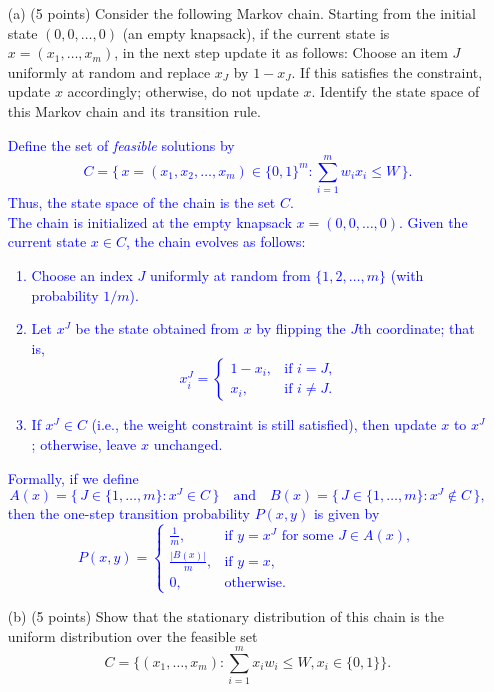 \documentclass{article}
\begin{document}
\begin{itemize}
    \item[(a)] (5 points) Consider the following Markov chain. Starting from the initial state $(0,0, \dots, 0)$ (an empty knapsack), if the current state is $x = (x_1, \dots, x_m)$, in the next step update it as follows: Choose an item $J$ uniformly at random and replace $x_J$ by $1 - x_J$. If this satisfies the constraint, update $x$ accordingly; otherwise, do not update $x$. Identify the state space of this Markov chain and its transition rule.

        \textcolor{blue}{
            Define the set of \emph{feasible} solutions by
\[
C = \{\, x = (x_1, x_2, \dots, x_m) \in \{0,1\}^m : \sum_{i=1}^m w_i x_i \le W \,\}.
\]
Thus, the state space of the chain is the set \( C \). \\ 
The chain is initialized at the empty knapsack \( x = (0,0,\dots,0) \). Given the current state \( x \in C \), the chain evolves as follows:
\begin{enumerate}
    \item Choose an index \( J \) uniformly at random from \( \{1,2,\dots, m\} \) (with probability \(1/m\)).
    \item Let \( x^J \) be the state obtained from \( x \) by flipping the \( J \)th coordinate; that is, 
    \[
    x^J_i = 
    \begin{cases}
    1-x_i, & \text{if } i=J, \\
    x_i, & \text{if } i\neq J.
    \end{cases}
    \]
    \item If \( x^J \in C \) (i.e., the weight constraint is still satisfied), then update \( x \) to \( x^J \); otherwise, leave \( x \) unchanged.
\end{enumerate}
Formally, if we define
\[
A(x) = \{\, J \in \{1,\dots, m\} : x^J \in C \,\} \quad \text{and} \quad B(x) = \{\, J \in \{1,\dots, m\} : x^J \notin C \,\},
\]
then the one-step transition probability \( P(x,y) \) is given by
\[
P(x,y) =
\begin{cases}
\displaystyle \frac{1}{m}, & \text{if } y = x^J \text{ for some } J \in A(x), \\[2mm]
\displaystyle \frac{|B(x)|}{m}, & \text{if } y = x, \\[2mm]
0, & \text{otherwise.}
\end{cases}
\]
        }
    
    \item[(b)] (5 points) Show that the stationary distribution of this chain is the uniform distribution over the feasible set 
    \[
    C = \{(x_1, \dots, x_m) : \sum_{i=1}^{m} x_i w_i \leq W, x_i \in \{0,1\}\}.
    \]


\end{itemize}
\end{document}
